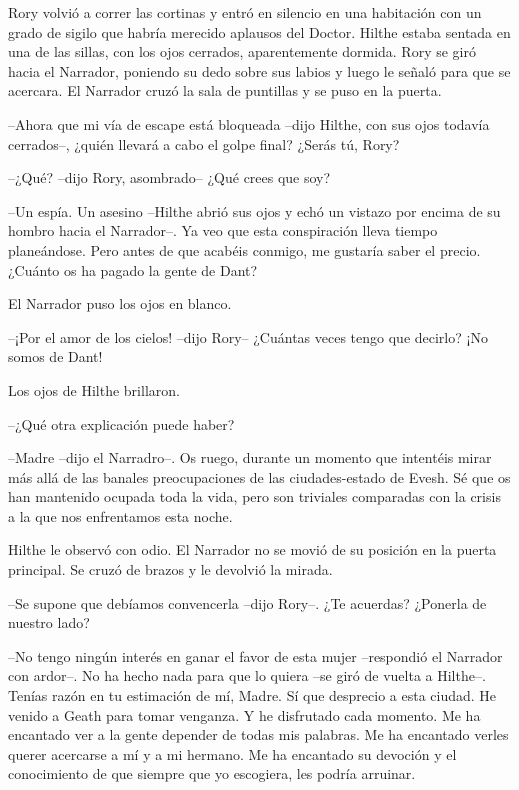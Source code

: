 {Rory volvió a correr las cortinas y entró en silencio en una habitación
	con un grado de sigilo que habría merecido aplausos del Doctor. Hilthe
	estaba sentada en una de las sillas, con los ojos cerrados,
	aparentemente dormida. Rory se giró hacia el Narrador, poniendo su dedo
	sobre sus labios y luego le señaló para que se acercara. El Narrador
cruzó la sala de puntillas y se puso en la puerta.}

{--Ahora que mi vía de escape está bloqueada --dijo Hilthe, con sus
	ojos todavía cerrados--, ¿quién llevará a cabo el golpe final? ¿Serás
tú, Rory?}

{--¿Qué? --dijo Rory, asombrado-- ¿Qué crees que soy?}

{--Un espía. Un asesino --Hilthe abrió sus ojos y echó un vistazo por
	encima de su hombro hacia el Narrador--. Ya veo que esta conspiración
	lleva tiempo planeándose. Pero antes de que acabéis conmigo, me gustaría
saber el precio. ¿Cuánto os ha pagado la gente de Dant?}

{El Narrador puso los ojos en blanco.}

{--¡Por el amor de los cielos! --dijo Rory-- ¿Cuántas veces tengo que
decirlo? ¡No somos de Dant!}

{Los ojos de Hilthe brillaron.}

{--¿Qué otra explicación puede haber?}

{--Madre --dijo el Narradro--. Os ruego, durante un momento que
	intentéis mirar más allá de las banales preocupaciones de las
	ciudades-estado de Evesh. Sé que os han mantenido ocupada toda la vida,
	pero son triviales comparadas con la crisis a la que nos enfrentamos
esta noche.}

{Hilthe le observó con odio. El Narrador no se movió de su posición en
la puerta principal. Se cruzó de brazos y le devolvió la mirada.}

{--Se supone que debíamos convencerla --dijo Rory--. ¿Te acuerdas?
¿Ponerla de nuestro lado?}

{--No tengo ningún interés en ganar el favor de esta mujer --respondió
	el Narrador con ardor--. No ha hecho nada para que lo quiera --se giró
	de vuelta a Hilthe--. Tenías razón en tu estimación de mí, Madre. Sí que
	desprecio a esta ciudad. He venido a Geath para tomar venganza. Y he
	disfrutado cada momento. Me ha encantado ver a la gente depender de
	todas mis palabras. Me ha encantado verles querer acercarse a mí y a mi
	hermano. Me ha encantado su devoción y el conocimiento de que siempre
que yo escogiera, les podría arruinar.}

